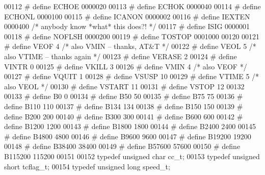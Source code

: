 \begin{DoxyCode}
00112 \textcolor{preprocessor}{# define ECHOE  0000020}
00113 \textcolor{preprocessor}{# define ECHOK  0000040}
00114 \textcolor{preprocessor}{# define ECHONL 0000100}
00115 \textcolor{preprocessor}{# define ICANON 0000002}
00116 \textcolor{preprocessor}{# define IEXTEN 0000400 }\textcolor{comment}{/* anybody know *what* this does?! */}\textcolor{preprocessor}{}
00117 \textcolor{preprocessor}{# define ISIG 0000001}
00118 \textcolor{preprocessor}{# define NOFLSH 0000200}
00119 \textcolor{preprocessor}{# define TOSTOP 0001000}
00120 
00121 \textcolor{preprocessor}{# define VEOF 4 }\textcolor{comment}{/* also VMIN -- thanks, AT&T */}\textcolor{preprocessor}{}
00122 \textcolor{preprocessor}{# define VEOL 5 }\textcolor{comment}{/* also VTIME -- thanks again */}\textcolor{preprocessor}{}
00123 \textcolor{preprocessor}{# define VERASE 2}
00124 \textcolor{preprocessor}{# define VINTR  0}
00125 \textcolor{preprocessor}{# define VKILL  3}
00126 \textcolor{preprocessor}{# define VMIN 4 }\textcolor{comment}{/* also VEOF */}\textcolor{preprocessor}{}
00127 \textcolor{preprocessor}{# define VQUIT  1}
00128 \textcolor{preprocessor}{# define VSUSP  10}
00129 \textcolor{preprocessor}{# define VTIME  5 }\textcolor{comment}{/* also VEOL */}\textcolor{preprocessor}{}
00130 \textcolor{preprocessor}{# define VSTART 11}
00131 \textcolor{preprocessor}{# define VSTOP  12}
00132 
00133 \textcolor{preprocessor}{# define B0 0}
00134 \textcolor{preprocessor}{# define B50  50}
00135 \textcolor{preprocessor}{# define B75  75}
00136 \textcolor{preprocessor}{# define B110 110}
00137 \textcolor{preprocessor}{# define B134 134}
00138 \textcolor{preprocessor}{# define B150 150}
00139 \textcolor{preprocessor}{# define B200 200}
00140 \textcolor{preprocessor}{# define B300 300}
00141 \textcolor{preprocessor}{# define B600 600}
00142 \textcolor{preprocessor}{# define B1200  1200}
00143 \textcolor{preprocessor}{# define B1800  1800}
00144 \textcolor{preprocessor}{# define B2400  2400}
00145 \textcolor{preprocessor}{# define B4800  4800}
00146 \textcolor{preprocessor}{# define B9600  9600}
00147 \textcolor{preprocessor}{# define B19200 19200}
00148 \textcolor{preprocessor}{# define B38400 38400}
00149 \textcolor{preprocessor}{# define B57600 57600}
00150 \textcolor{preprocessor}{# define B115200 115200}
00151 
00152 \textcolor{keyword}{typedef} \textcolor{keywordtype}{unsigned} \textcolor{keywordtype}{char} cc_t;
00153 \textcolor{keyword}{typedef} \textcolor{keywordtype}{unsigned} \textcolor{keywordtype}{short} tcflag_t;
00154 \textcolor{keyword}{typedef} \textcolor{keywordtype}{unsigned} \textcolor{keywordtype}{long} speed_t;

\end{DoxyCode}
